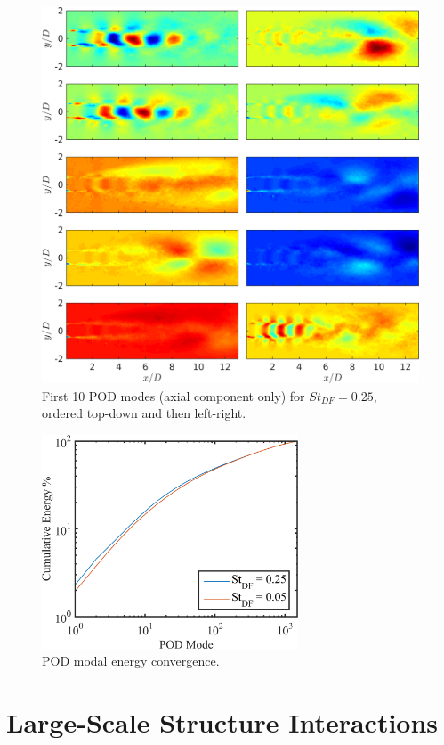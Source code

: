 \begin{figure}
	\centering
	\includegraphics[width=1\linewidth]{Figures/ch4_St025_POD_Modes.png}
	\caption{First 10 POD modes (axial component only) for $St_{DF} = 0.25$, ordered top-down and then left-right.}
	\label{fig:ch4_St025_PODmodes}
\end{figure}
\begin{figure}
	\centering
	\includegraphics[width=3in]{Figures/ch4_POD_energies.png}
	\caption{POD modal energy convergence.}
	\label{fig:ch4_modal_energy}
\end{figure}


\section{Large-Scale Structure Interactions}
